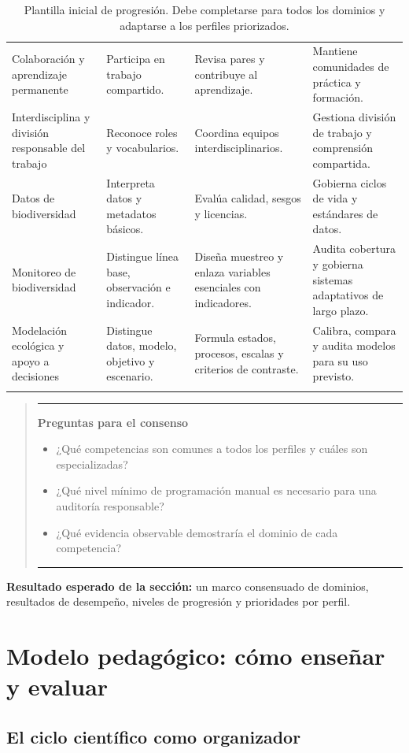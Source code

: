 \documentclass[11pt,a4paper]{article}
\newenvironment{preguntas}
  {\par\medskip\begin{quote}\color{azulieb}\hrule\smallskip
   \textbf{Preguntas para el consenso}\par\smallskip\begin{itemize}}
  {\end{itemize}\smallskip\hrule\end{quote}\par\medskip}
\begin{document}
\begin{longtable}{@{}p{3.4cm}p{3.5cm}p{3.5cm}p{3.5cm}@{}}
Colaboración y aprendizaje permanente &
Participa en trabajo compartido. &
Revisa pares y contribuye al aprendizaje. &
Mantiene comunidades de práctica y formación.\\
Interdisciplina y división responsable del trabajo &
Reconoce roles y vocabularios. &
Coordina equipos interdisciplinarios. &
Gestiona división de trabajo y comprensión compartida.\\
Datos de biodiversidad &
Interpreta datos y metadatos básicos. &
Evalúa calidad, sesgos y licencias. &
Gobierna ciclos de vida y estándares de datos.\\
Monitoreo de biodiversidad &
Distingue línea base, observación e indicador. &
Diseña muestreo y enlaza variables esenciales con indicadores. &
Audita cobertura y gobierna sistemas adaptativos de largo plazo.\\
Modelación ecológica y apoyo a decisiones &
Distingue datos, modelo, objetivo y escenario. &
Formula estados, procesos, escalas y criterios de contraste. &
Calibra, compara y audita modelos para su uso previsto.\\
\bottomrule
\caption{Plantilla inicial de progresión. Debe completarse para todos los
dominios y adaptarse a los perfiles priorizados.}
\end{longtable}

\begin{preguntas}
  \item ¿Qué competencias son comunes a todos los perfiles y cuáles son
  especializadas?
  \item ¿Qué nivel mínimo de programación manual es necesario para una auditoría
  responsable?
  \item ¿Qué evidencia observable demostraría el dominio de cada competencia?
\end{preguntas}

\noindent\textbf{Resultado esperado de la sección:}
un marco consensuado de dominios, resultados de desempeño, niveles de progresión
y prioridades por perfil.

\section{Modelo pedagógico: cómo enseñar y evaluar}

\subsection{El ciclo científico como organizador}
\end{document}
